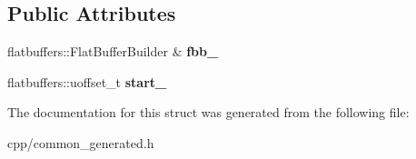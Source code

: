 \subsection*{Public Attributes}
\begin{DoxyCompactItemize}
\item 
\mbox{\label{structquantra_1_1PricingBuilder_ac59959cf30e9a4a00da5d92b08f437a6}} 
flatbuffers\+::\+Flat\+Buffer\+Builder \& {\bfseries fbb\+\_\+}
\item 
\mbox{\label{structquantra_1_1PricingBuilder_a2c02c06300fe9a82a13cb6212718d657}} 
flatbuffers\+::uoffset\+\_\+t {\bfseries start\+\_\+}
\end{DoxyCompactItemize}


The documentation for this struct was generated from the following file\+:\begin{DoxyCompactItemize}
\item 
cpp/common\+\_\+generated.\+h\end{DoxyCompactItemize}
